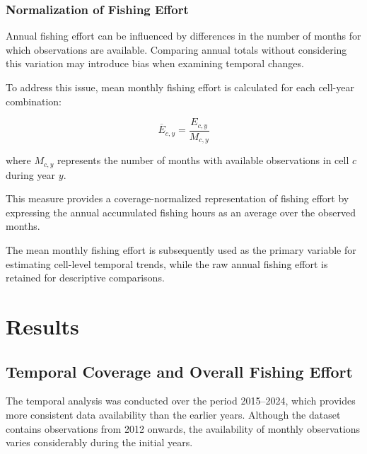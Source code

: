 \documentclass[pdflatex,sn-mathphys-num]{sn-jnl}
\theoremstyle{thmstyleone}
\theoremstyle{thmstyletwo}
\theoremstyle{thmstylethree}
\begin{document}
\subsubsection{Normalization of Fishing Effort}

Annual fishing effort can be influenced by
differences in the number of months for which
observations are available. Comparing annual
totals without considering this variation may
introduce bias when examining temporal changes.

To address this issue, mean monthly fishing
effort is calculated for each cell-year
combination:

\begin{equation}
\overline{E}_{c,y} =
\frac{E_{c,y}}{M_{c,y}}
\label{eq:mean-monthly-effort}
\end{equation}

where $M_{c,y}$ represents the number of months
with available observations in cell $c$ during
year $y$.

This measure provides a coverage-normalized
representation of fishing effort by expressing
the annual accumulated fishing hours as an
average over the observed months.

The mean monthly fishing effort is subsequently
used as the primary variable for estimating
cell-level temporal trends, while the raw annual
fishing effort is retained for descriptive
comparisons.




\section{Results}\label{sec:results}


\subsection{Temporal Coverage and Overall Fishing Effort}
\label{subsec:overall-results}

The temporal analysis was conducted over the period
2015--2024, which provides more consistent data
availability than the earlier years. Although the
dataset contains observations from 2012 onwards,
the availability of monthly observations varies
considerably during the initial years.
\end{document}
